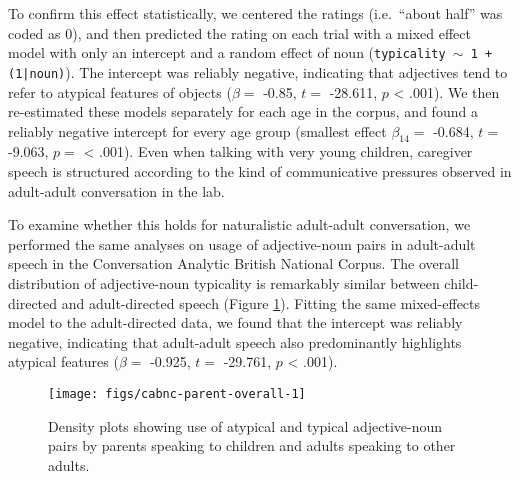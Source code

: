\documentclass{ucetd}
\begin{document}
To confirm this effect statistically, we centered the ratings
(i.e.~``about half'' was coded as 0), and then predicted the rating on
each trial with a mixed effect model with only an intercept and a random
effect of noun (\texttt{typicality $\sim$ 1 + (1|noun)}). The intercept
was reliably negative, indicating that adjectives tend to refer to
atypical features of objects (\(\beta =\) -0.85, \(t =\) -28.611, \(p\)
\textless{} .001). We then re-estimated these models separately for each
age in the corpus, and found a reliably negative intercept for every age
group (smallest effect \(\beta_{14} =\) -0.684, \(t =\) -9.063, \(p =\)
\textless{} .001). Even when talking with very young children, caregiver
speech is structured according to the kind of communicative pressures
observed in adult-adult conversation in the lab.

To examine whether this holds for naturalistic adult-adult conversation,
we performed the same analyses on usage of adjective-noun pairs in
adult-adult speech in the Conversation Analytic British National Corpus.
The overall distribution of adjective-noun typicality is remarkably
similar between child-directed and adult-directed speech (Figure
\ref{fig:cabnc-parent-overall}). Fitting the same mixed-effects model to
the adult-directed data, we found that the intercept was reliably
negative, indicating that adult-adult speech also predominantly
highlights atypical features (\(\beta =\) -0.925, \(t =\) -29.761, \(p\)
\textless{} .001).

\begin{figure}[tb]

{\centering \texttt{[image: figs/cabnc-parent-overall-1]} 

}

\caption{Density plots showing use of atypical and typical adjective-noun pairs by parents speaking to children and adults speaking to other adults.}\label{fig:cabnc-parent-overall}
\end{figure}
\end{document}
